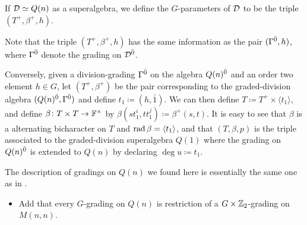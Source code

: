 \begin{defi}
    If $\mathcal{D} \simeq Q(n)$ as a superalgebra, we define the $G$-parameters of $\mathcal{D}$ to be the triple $(T^+, \beta^+, h)$.
\end{defi}

Note that the triple $(T^+, \beta^+, h)$ has the same information as the pair $(\Gamma^{\bar0}, h)$, where $\Gamma^{\bar0}$ denote the grading on $\mathcal{D}^{\bar0}$.

Conversely, given a division-grading $\Gamma^{\bar0}$ on the algebra $Q(n)^{\bar0}$ and an order two element $h \in G$, let $(T^+, \beta^+)$ be the pair corresponding to the graded-division algebra $(Q(n)^{\bar0}, \Gamma^{\bar0})$ and define $t_1 \coloneqq (h, \bar 1)$. 
We can then define $T \coloneqq T^+ \times \langle t_1 \rangle$, and define $\beta\colon T\times T \to \mathbb{F}^\times$ by $\beta(s t_1^i, t t_1^j) \coloneqq \beta^+(s, t)$. 
It is easy to see that $\beta$ is a alternating bicharacter on $T$ and $\operatorname{rad} \beta = \langle t_1 \rangle$, and that $(T, \beta, p)$ is the triple associated to the graded-division superalgebra $Q(1)$ where the grading on $Q(n)^{\bar0}$ is extended to $Q(n)$ by declaring $\deg u \coloneqq t_1$.  


    

\begin{remark}
    The description of gradings on $Q(n)$ we found here
    is essentially the same one as in \cite[Theorem 5.5]{paper-Qn}.
\end{remark}

\begin{itemize}
    \item Add that every $G$-grading on $Q(n)$ is restriction of a $G\times \mathbb{Z}_2$-grading on $M(n,n)$.
\end{itemize}



